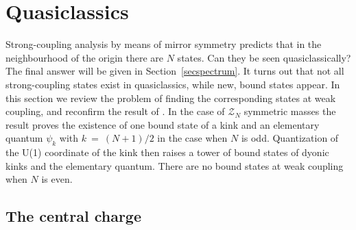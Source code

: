 \documentclass[epsfig,12pt]{article}
\newcommand{\mc}[1]{\mathcal{#1}}
\begin{document}
\newpage
\section{Quasiclassics}
\label{qclassics}
\setcounter{equation}{0}

	Strong-coupling analysis by means of mirror symmetry predicts that in the neighbourhood of the origin
	there are $ N $ states.
	Can they be seen quasiclassically?
	The final answer will be given in Section~\ref{secspectrum}.
	It turns out that not all strong-coupling states exist in quasiclassics, while new, bound states appear.
	In this section we review the problem of finding the corresponding states at weak coupling, and 
	reconfirm the result of 
\cite{Dorey:1998yh}.
	In the case of $ \mc{Z}_N $ symmetric masses the result proves the existence of one bound state of a kink
	and an elementary quantum $ \psi_k $ with $ k ~=~ (N+1)/2 $ in the case when $ N $ is odd.
	Quantization of the U(1) coordinate of the kink then raises a tower of bound states of dyonic kinks
	and the elementary quantum.
	There are no bound states at weak coupling when $ N $ is even.



\subsection{The central charge}
\end{document}
